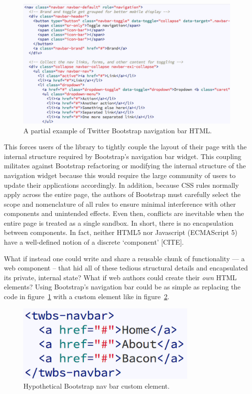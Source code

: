 % 
\begin{figure}[htb]
\centering
 \includegraphics[width=6in]{images/bootstrap_navbar_html.png}
\caption{A partial example of Twitter Bootstrap navigation bar HTML.}
\label{f:twbs1}
\end{figure}
%

This forces users of the library to tightly couple the layout of their page with the internal structure required by Bootstrap's navigation bar widget. 
This coupling militates against Bootstrap refactoring or modifying the internal structure of the navigation widget because this would require the large community of users to update their applications accordingly.
In addition, because CSS rules normally apply across the entire page, the authors of Bootstrap must carefully select the scope and nomenclature of all rules to ensure minimal interference with other components and unintended effects. 
Even then, conflicts are inevitable when the entire page is treated as a single sandbox. 
In short, there is no encapsulation between components. 
In fact, neither HTML5 nor Javascript (ECMAScript 5) have a well-defined notion of a discrete `component' [CITE].

What if instead one could write and share a reusable chunk of functionality --- a web component -- that hid all of these tedious structural details and encapsulated its private, internal state? What if web authors could create their \textit{own} HTML elements?  Using Bootstrap's navigation bar could be as simple as replacing the code in figure~\ref{f:twbs1} with a custom element like in figure~\ref{f:twbs2}.

% 
\begin{figure}[htb]
\centering
 \includegraphics[width=3.5in]{images/bootstrap_navbar_wc.png}
\caption{Hypothetical Bootstrap nav bar custom element.}
\label{f:twbs2}
\end{figure}
%


